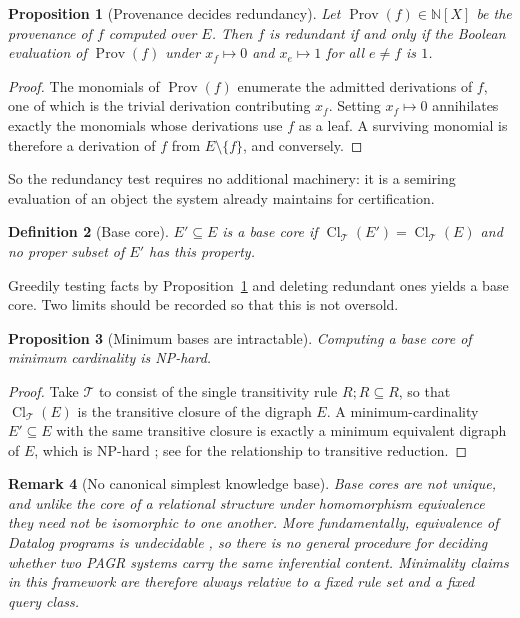\documentclass[11pt]{article}
\newtheorem{definition}{Definition}[section]
\newtheorem{proposition}[definition]{Proposition}
\newtheorem{remark}[definition]{Remark}
\newcommand{\Cl}{\operatorname{Cl}}
\newcommand{\Prov}{\operatorname{Prov}}
\newcommand{\T}{\mathcal{T}}
\begin{document}
\begin{proposition}[Provenance decides redundancy]
\label{prop:prov-redundant}
Let $\Prov(f)\in\mathbb{N}[X]$ be the provenance of $f$ computed over $E$. Then $f$ is redundant if and only if the Boolean evaluation of $\Prov(f)$ under $x_f\mapsto 0$ and $x_e\mapsto 1$ for all $e\neq f$ is $1$.
\end{proposition}
\begin{proof}
The monomials of $\Prov(f)$ enumerate the admitted derivations of $f$, one of which is the trivial derivation contributing $x_f$. Setting $x_f\mapsto0$ annihilates exactly the monomials whose derivations use $f$ as a leaf. A surviving monomial is therefore a derivation of $f$ from $E\setminus\{f\}$, and conversely.
\end{proof}

So the redundancy test requires no additional machinery: it is a semiring evaluation of an object the system already maintains for certification.

\begin{definition}[Base core]
$E'\subseteq E$ is a \emph{base core} if $\Cl_{\T}(E')=\Cl_{\T}(E)$ and no proper subset of $E'$ has this property.
\end{definition}

Greedily testing facts by Proposition~\ref{prop:prov-redundant} and deleting redundant ones yields a base core. Two limits should be recorded so that this is not oversold.

\begin{proposition}[Minimum bases are intractable]
\label{prop:min-np}
Computing a base core of minimum cardinality is NP-hard.
\end{proposition}
\begin{proof}
Take $\T$ to consist of the single transitivity rule $R;R\subseteq R$, so that $\Cl_{\T}(E)$ is the transitive closure of the digraph $E$. A minimum-cardinality $E'\subseteq E$ with the same transitive closure is exactly a minimum equivalent digraph of $E$, which is NP-hard \citep{garey1979}; see \citet{aho1972} for the relationship to transitive reduction.
\end{proof}

\begin{remark}[No canonical simplest knowledge base]
\label{rem:no-canonical}
Base cores are not unique, and unlike the core of a relational structure under homomorphism equivalence \citep{chandra1977} they need not be isomorphic to one another. More fundamentally, equivalence of Datalog programs is undecidable \citep{shmueli1993}, so there is no general procedure for deciding whether two PAGR systems carry the same inferential content. Minimality claims in this framework are therefore always relative to a fixed rule set and a fixed query class.
\end{remark}
\end{document}
